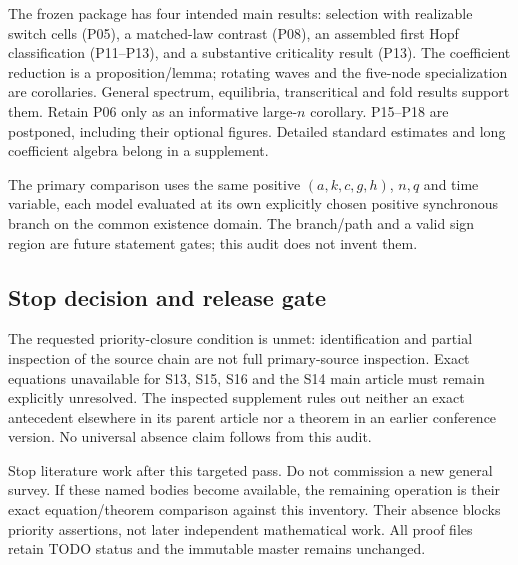 The frozen package has four intended main results: selection with realizable
switch cells (P05), a matched-law contrast (P08), an assembled first Hopf
classification (P11--P13), and a substantive criticality result (P13).
The coefficient reduction is a proposition/lemma; rotating waves and the
five-node specialization are corollaries. General spectrum, equilibria,
transcritical and fold results support them. Retain P06 only as an informative
large-$n$ corollary. P15--P18 are postponed, including their optional figures.
Detailed standard estimates and long coefficient algebra belong in a supplement.

The primary comparison uses the same positive $(a,k,c,g,h)$, $n,q$ and time
variable, each model evaluated at its own explicitly chosen positive synchronous
branch on the common existence domain. The branch/path and a valid sign region
are future statement gates; this audit does not invent them.

\subsection{Stop decision and release gate}
The requested priority-closure condition is unmet: identification and partial
inspection of the source chain are not full primary-source inspection.
Exact equations unavailable for S13, S15, S16 and the S14 main article must
remain explicitly unresolved. The inspected supplement rules out neither an
exact antecedent elsewhere in its parent article nor a theorem in an earlier
conference version. No universal absence claim follows from this audit.

Stop literature work after this targeted pass. Do not commission a new general
survey. If these named bodies become available, the remaining operation is
their exact equation/theorem comparison against this inventory. Their absence
blocks priority assertions, not later independent mathematical work. All proof
files retain TODO status and the immutable master remains unchanged.
